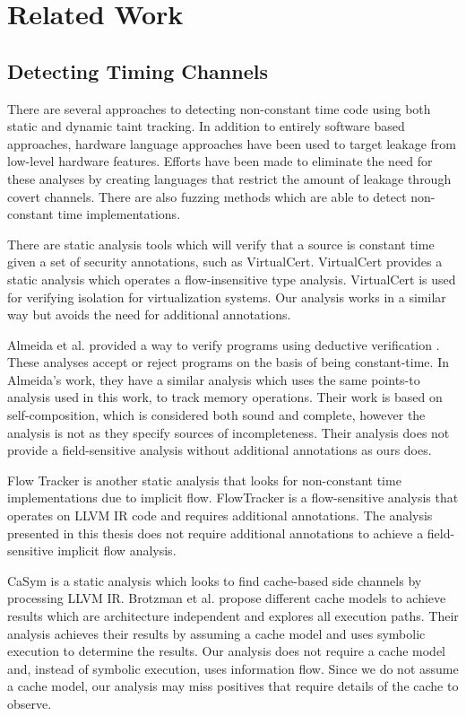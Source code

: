 \section{Related Work}
\subsection{Detecting Timing Channels}
   There are several approaches to detecting non-constant time code using both
   static and dynamic taint tracking. In addition to entirely software based
   approaches, hardware language approaches have been used to target leakage from
   low-level hardware features. Efforts have been made to eliminate the
   need for these analyses by creating languages that restrict the amount of
   leakage through covert channels. There are also fuzzing methods which are
   able to detect non-constant time implementations\cite{Somorovsky}.

   There are static analysis tools which will verify that a source is constant
   time given a set of security annotations, such as
   VirtualCert\cite{VirtualCert}. VirtualCert provides a static analysis which
   operates a flow-insensitive type analysis. VirtualCert is used for verifying
   isolation for virtualization systems. Our analysis works in a similar way but
   avoids the need for additional annotations.

   Almeida et al. provided a way to verify programs using deductive verification
   \cite{almeida2016verifying}. These analyses accept or reject programs on the
   basis of being constant-time. In Almeida's work, they have a similar analysis
   which uses the same points-to analysis used in this work, to track memory
   operations. Their work is based on self-composition, which is considered both
   sound and complete, however the analysis is not as they specify sources
   of incompleteness. Their analysis does not provide a field-sensitive
   analysis without additional annotations as ours does.

   Flow Tracker is another static analysis that looks for non-constant time
   implementations due to implicit flow\cite{FlowTracker}. FlowTracker is a
   flow-sensitive analysis that operates on LLVM IR code and requires additional
   annotations. The analysis presented in this thesis does not require
   additional annotations to achieve a field-sensitive implicit flow analysis.

   CaSym is a static analysis which looks to find cache-based side channels by
   processing LLVM IR\cite{brotzmancasym}. Brotzman et al. propose different
   cache models to achieve results which are architecture independent and
   explores all execution paths. Their analysis achieves their results by
   assuming a cache model and uses symbolic execution to determine the results.
   Our analysis does not require a cache model and, instead of symbolic
   execution, uses information flow. Since we do not assume a cache model, our
   analysis may miss positives that require details of the cache to
   observe.

